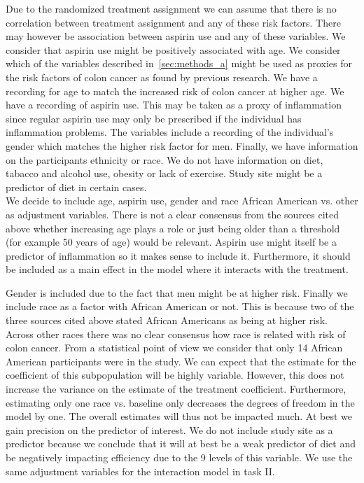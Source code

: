 \documentclass[paper=a4, fontsize=11pt]{scrartcl} %
\numberwithin{equation}{section} %
\numberwithin{figure}{section} %
\numberwithin{table}{section} %
\begin{document}
Due to the randomized treatment assignment we can assume that there is no correlation between treatment assignment and any of these risk factors. There may however be association between aspirin use and any of these variables. We consider that aspirin use might be positively associated with age.
We consider which of the variables described in~\ref{sec:methods_a} might be used as proxies for the risk factors of colon cancer as found by previous research.
We have a recording for age to match the increased risk of colon cancer at higher age.
We have a recording of aspirin use. This may be taken as a proxy of inflammation since regular aspirin use may only be prescribed if the individual has inflammation problems. 
The variables include a recording of the individual's gender which matches the higher risk factor for men.
Finally, we have information on the participants ethnicity or race.
We do not have information on diet, tabacco and alcohol use, obesity or lack of exercise. Study site might be a predictor of diet in certain cases.\\


We decide to include age, aspirin use, gender and race African American vs. other as adjustment variables.
There is not a clear consensus from the sources cited above whether increasing age plays a role or just being older than a threshold (for example 50 years of age) would be relevant.
Aspirin use might itself be a predictor of inflammation so it makes sense to include it. Furthermore, it should be included as a main effect in the model where it interacts with the treatment.

Gender is included due to the fact that men might be at higher risk.
Finally we include race as a factor with African American or not. This is because two of the three sources cited above stated African Americans as being at higher risk. Across other races there was no clear consensus how race is related with risk of colon cancer. From a statistical point of view we consider that only 14 African American participants were in the study. We can expect that the estimate for the coefficient of this subpopulation will be highly variable. However, this does not increase the variance on the estimate of the treatment coefficient. Furthermore, estimating only one race vs. baseline only decreases the degrees of freedom in the model by one. The overall estimates will thus not be impacted much. At best we gain precision on the predictor of interest.
We do not include study site as a predictor because we conclude that it will at best be a weak predictor of diet and be negatively impacting efficiency due to the 9 levels of this variable. We use the same adjustment variables for the interaction model in task II.\\
\end{document}
